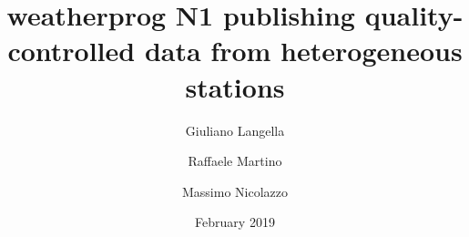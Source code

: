 \documentclass[authoryear,preprint,review,12pt]{elsarticle}
\begin{document}
\begin{frontmatter}



\title{weatherprog N1 publishing quality-controlled data from heterogeneous stations}


\author[dia]{Giuliano Langella}
\address[dia]{Department of Agriculture, University of Naples Federico II, Via Università 100, 80055 Portici, NA, Italy}

\author[deeit]{Raffaele Martino}
\author[deeit]{Massimo Nicolazzo}
\address[deeit]{Department of Electrical Engineering and Information Technology, University of Naples Federico II, Via Claudio 21, 80125 Naples, NA, Italy}

\date{February 2019}


\end{frontmatter}
\end{document}
